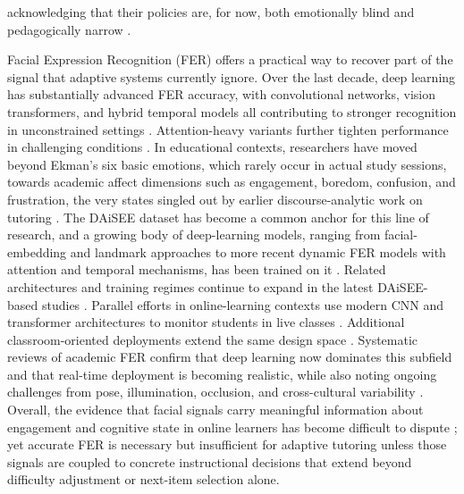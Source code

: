 acknowledging that their policies are, for now, both emotionally blind and pedagogically narrow \cite{axak_adaptive_nodate,guzman_developing_2025}.

Facial Expression Recognition (FER) offers a practical way to recover part of the signal that adaptive systems currently ignore. Over the last decade, deep learning has substantially advanced FER accuracy, with convolutional networks, vision transformers, and hybrid temporal models all contributing to stronger recognition in unconstrained settings \cite{lek_academic_2023,liu_dynamic_nodate,aly_revolutionizing_2025}. Attention-heavy variants further tighten performance in challenging conditions \cite{aly_comprehensive_2025}. In educational contexts, researchers have moved beyond Ekman's six basic emotions, which rarely occur in actual study sessions, towards academic affect dimensions such as engagement, boredom, confusion, and frustration, the very states singled out by earlier discourse-analytic work on tutoring \cite{leong_deep_2020,dmello_language_2012}. The DAiSEE dataset has become a common anchor for this line of research, and a growing body of deep-learning models, ranging from facial-embedding and landmark approaches to more recent dynamic FER models with attention and temporal mechanisms, has been trained on it \cite{leong_deep_2020,asaju_adaptive_2022,mehta_three-dimensional_2022}. Related architectures and training regimes continue to expand in the latest DAiSEE-based studies \cite{komaravalli_detecting_2023,liu_dynamic_nodate,rao_recognition_2021}. Parallel efforts in online-learning contexts use modern CNN and transformer architectures to monitor students in live classes \cite{aly_revolutionizing_2025,aly_enhancing_2023}. Additional classroom-oriented deployments extend the same design space \cite{aly_comprehensive_2025,gupta_edfa_2023}. Systematic reviews of academic FER confirm that deep learning now dominates this subfield and that real-time deployment is becoming realistic, while also noting ongoing challenges from pose, illumination, occlusion, and cross-cultural variability \cite{lek_academic_2023,fernandez-herrero_evaluating_2024}. Overall, the evidence that facial signals carry meaningful information about engagement and cognitive state in online learners has become difficult to dispute \cite{mehta_three-dimensional_2022,gupta_edfa_2023,woolf_face_2023}; yet accurate FER is necessary but insufficient for adaptive tutoring unless those signals are coupled to concrete instructional decisions that extend beyond difficulty adjustment or next-item selection alone.

